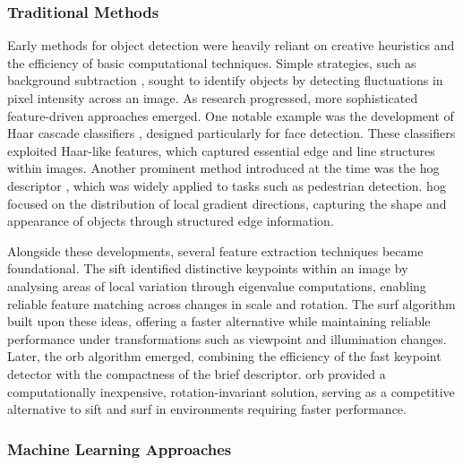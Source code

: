 \subsubsection{Traditional Methods}
\label{subsubsec:2_traditional}
Early methods for object detection were heavily reliant on creative heuristics and the efficiency of basic computational techniques. Simple strategies, such as background subtraction \cite{garcia2020background}, sought to identify objects by detecting fluctuations in pixel intensity across an image. As research progressed, more sophisticated feature-driven approaches emerged. One notable example was the development of Haar cascade classifiers \cite{vinh2020real, javed2022human}, designed particularly for face detection. These classifiers exploited Haar-like features, which captured essential edge and line structures within images.
Another prominent method introduced at the time was the \gls{hog} descriptor \cite{dalal2005histograms, bhattarai2023histogram}, which was widely applied to tasks such as pedestrian detection. \gls{hog} focused on the distribution of local gradient directions, capturing the shape and appearance of objects through structured edge information.

Alongside these developments, several feature extraction techniques became foundational. The \gls{sift} \cite{lowe2004distinctive} identified distinctive keypoints within an image by analysing areas of local variation through eigenvalue computations, enabling reliable feature matching across changes in scale and rotation. The \gls{surf} algorithm \cite{bay2006surf} built upon these ideas, offering a faster alternative while maintaining reliable performance under transformations such as viewpoint and illumination changes.
Later, the \gls{orb} algorithm \cite{rublee2011orb} emerged, combining the efficiency of the \gls{fast} keypoint detector with the compactness of the \gls{brief} descriptor. \gls{orb} provided a computationally inexpensive, rotation-invariant solution, serving as a competitive alternative to \gls{sift} and \gls{surf} in environments requiring faster performance.

\subsubsection{Machine Learning Approaches}
\label{subsubsec:2_machine_learning}

